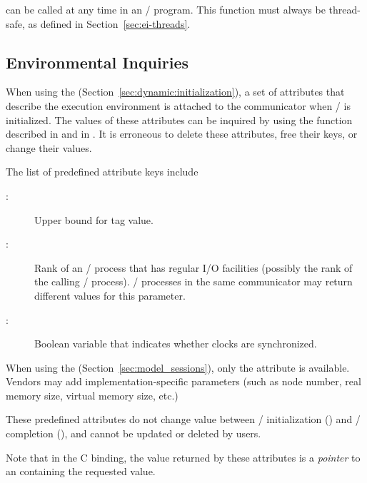  can be called
at any time in an \MPI/ program.
This function must always be thread-safe, as defined in
Section~\ref{sec:ei-threads}.

\subsection{Environmental Inquiries}
\label{subsec:inquiry-inquiry}

When using the \wpm{}\mpitermindex{\wpm} (Section~\ref{sec:dynamic:initialization}),
a set of attributes that describe the execution environment is attached to
the communicator  when \MPI/ is initialized.
The values of these attributes can be inquired by using the function
described in 
 and in .
It is erroneous to delete these attributes,
free their keys, or change their values.

The list of predefined attribute keys include
\begin{description}
\item[:]  Upper bound for tag value.
\item[:] Rank of an \mpi/ process that has regular I/O facilities (possibly
the rank of the calling \mpi/ process).  \mpi/ processes in the same communicator may return different values for this
parameter.
\item[:] Boolean variable that indicates
whether clocks are synchronized.
\end{description}

When using the \spm{}\mpitermindex{\spm} (Section~\ref{sec:model_sessions}),
only the  attribute is available.
%
Vendors may add implementation-specific parameters (such as node number,
real memory size, virtual memory size, etc.)

These predefined attributes do not change value between \MPI/
initialization () and \MPI/ completion
(), and cannot be updated or deleted by users.

\begin{users}
Note that in the C binding, the value returned by these attributes is a 
\emph{pointer} to an  containing the requested value.
\end{users}

